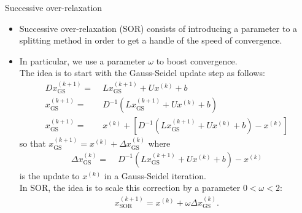 \documentclass[t,usepdftitle=false]{beamer}
\begin{document}
\begin{frame}{Successive over-relaxation}
\begin{itemize}
\item Successive over-relaxation (SOR) consists of introducing a parameter to a splitting method in order to get a handle of the speed of convergence.
\item In particular, we use a parameter $\omega$ to boost convergence.\vspace{.1cm}\\
The idea is to start with the Gauss-Seidel update step as follows:
\begin{align*}
Dx_{\mathrm{GS}}^{(k+1)}=&\;Lx_{\mathrm{GS}}^{(k+1)}+Ux^{(k)}+b\\
x_{\mathrm{GS}}^{(k+1)}=&\;D^{-1}\left(Lx_{\mathrm{GS}}^{(k+1)}+Ux^{(k)}+b\right)\\
x_{\mathrm{GS}}^{(k+1)}=&\;x^{(k)}+\left[D^{-1}\left(Lx_{\mathrm{GS}}^{(k+1)}+Ux^{(k)}+b\right)-x^{(k)}\right]
\end{align*}
so that $x_{\mathrm{GS}}^{(k+1)}=x^{(k)}+\Delta x_{\mathrm{GS}}^{(k)}$ where
\begin{align*}
\Delta x_{\mathrm{GS}}^{(k)}=&\;D^{-1}\left(Lx_{\mathrm{GS}}^{(k+1)}+Ux^{(k)}+b\right)-x^{(k)}
\end{align*}
is the update to $x^{(k)}$ in a Gauss-Seidel iteration.\vspace{.1cm}\\
In SOR, the idea is to scale this correction by a parameter $0<\omega<2$:
\begin{align*}
x_{\mathrm{SOR}}^{(k+1)}=x^{(k)}+\omega\Delta x_{\mathrm{GS}}^{(k)}.
\end{align*}
\end{itemize}
\end{frame}
\end{document}
